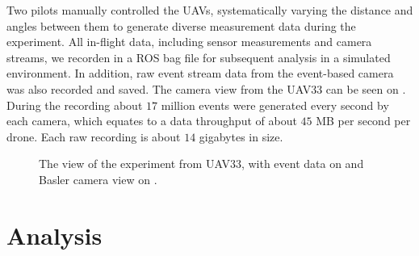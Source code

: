 Two pilots manually controlled the \ac{UAV}s, systematically varying the distance and angles between them to generate diverse measurement data during the experiment. All in-flight data, including sensor measurements and camera streams, we recorden in a \ac{ROS} bag file for subsequent analysis
in a simulated environment. In addition, raw event stream data from the event-based camera was also recorded and saved. The camera view from the UAV33
can be seen on . During the recording about $17$ million events were generated every second by each camera, which equates to a data
throughput of about $45$ MB per second per drone. Each raw recording is about $14$ gigabytes in size.

\begin{figure}[H]
	\centering
	\caption{
		The view of the experiment from UAV33, with event data on  and Basler camera view on .
  }
	\label{fig:exp1}
\end{figure}




\section{Analysis}







